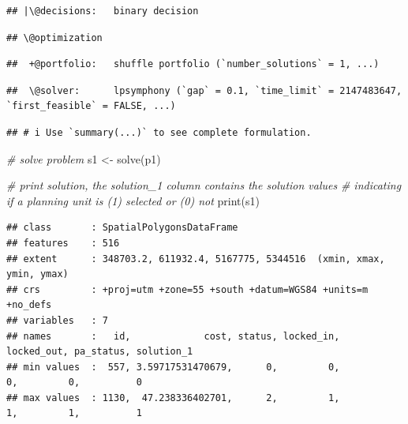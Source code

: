 \documentclass[
  12pt,
]{book}
\newenvironment{Shaded}{\begin{snugshade}}{\end{snugshade}}
\newcommand{\CommentTok}[1]{\textcolor[rgb]{0.56,0.35,0.01}{\textit{#1}}}
\newcommand{\FunctionTok}[1]{\textcolor[rgb]{0.00,0.00,0.00}{#1}}
\newcommand{\NormalTok}[1]{#1}
\newcommand{\OtherTok}[1]{\textcolor[rgb]{0.56,0.35,0.01}{#1}}
\newcommand{\SpecialCharTok}[1]{\textcolor[rgb]{0.00,0.00,0.00}{#1}}
\begin{document}
\begin{verbatim}
## |\@decisions:   binary decision
\end{verbatim}

\begin{verbatim}
## \@optimization
\end{verbatim}

\begin{verbatim}
##  +@portfolio:   shuffle portfolio (`number_solutions` = 1, ...)
\end{verbatim}

\begin{verbatim}
##  \@solver:      lpsymphony (`gap` = 0.1, `time_limit` = 2147483647, `first_feasible` = FALSE, ...)
\end{verbatim}

\begin{verbatim}
## # i Use `summary(...)` to see complete formulation.
\end{verbatim}

\begin{Shaded}
\begin{Highlighting}[]
\CommentTok{\# solve problem}
\NormalTok{s1 }\OtherTok{\textless{}{-}} \FunctionTok{solve}\NormalTok{(p1)}

\CommentTok{\# print solution, the solution\_1 column contains the solution values}
\CommentTok{\# indicating if a planning unit is (1) selected or (0) not}
\FunctionTok{print}\NormalTok{(s1)}
\end{Highlighting}
\end{Shaded}

\begin{verbatim}
## class       : SpatialPolygonsDataFrame 
## features    : 516 
## extent      : 348703.2, 611932.4, 5167775, 5344516  (xmin, xmax, ymin, ymax)
## crs         : +proj=utm +zone=55 +south +datum=WGS84 +units=m +no_defs 
## variables   : 7
## names       :   id,             cost, status, locked_in, locked_out, pa_status, solution_1 
## min values  :  557, 3.59717531470679,      0,         0,          0,         0,          0 
## max values  : 1130,  47.238336402701,      2,         1,          1,         1,          1
\end{verbatim}

\begin{Shaded}
\end{Shaded}
\end{document}
